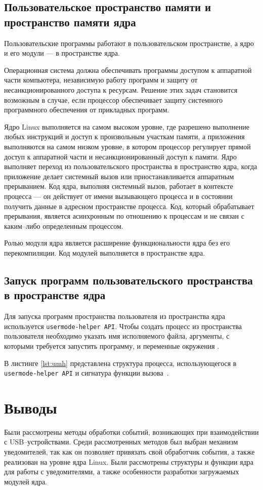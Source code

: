 \subsection{Пользовательское пространство памяти и пространство памяти ядра}

Пользовательские программы работают в пользовательском пространстве, а ядро и его модули --- в пространстве ядра.

Операционная система должна обеспечивать программы доступом к аппаратной части компьютера, независимую работу программ и защиту от несанкционированного доступа к ресурсам. Решение этих задач становится возможным в случае, если процессор обеспечивает защиту системного программного обеспечения от прикладных программ.

Ядро Linux выполняется на самом высоком уровне, где разрешено выполнение любых инструкций и доступ к произвольным участкам памяти, а приложения выполняются на самом низком уровне, в котором процессор регулирует прямой доступ к аппаратной части и несанкционированный доступ к памяти. Ядро выполняет переход из пользовательского пространства в пространство ядра, когда приложение делает системный вызов или приостанавливается аппаратным прерыванием. Код ядра, выполняя системный вызов, работает в контексте процесса --- он действует от имени вызывающего процесса и в состоянии получить данные в адресном пространстве процесса. Код, который обрабатывает прерывания, является асинхронным по отношению к процессам и не связан с каким--либо определенным процессом.

Ролью модуля ядра является расширение функциональности ядра без его перекомпиляции. Код модулей выполняется в пространстве ядра.

\subsection{Запуск программ пользовательского пространства в пространстве ядра}

Для запуска программ пространства пользователя из пространства ядра используется \texttt{usermode-helper API}. Чтобы создать процесс из пространства пользователя необходимо указать имя исполняемого файла, аргументы, с которыми требуется запустить программу, и переменные окружения \cite{umhelper}.

В листинге \ref{lst:umh} представлена структура процесса, использующегося в \texttt{usermode-helper API} и сигнатура функции вызова~\cite{umh}.

\section*{Выводы}

Были рассмотрены методы обработки событий, возникающих при взаимодействии с USB--устройствами. Среди рассмотренных методов был выбран механизм уведомителей, так как он позволяет привязать свой обработчик события, а также реализован на уровне ядра Linux. Были рассмотрены структуры и функции ядра для работы с уведомителями, а также особенности разработки загружаемых модулей ядра.

